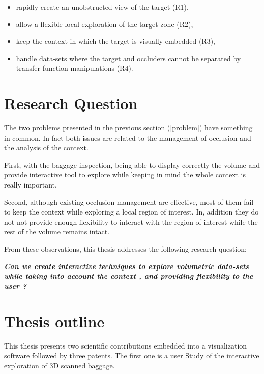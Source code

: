 \begin{itemize}

\item rapidly create an unobstructed view of the target (R1),

\item allow a flexible local exploration of the target zone (R2),

\item keep the context in which the target is visually embedded (R3),

\item handle data-sets where the target and occluders cannot 
be separated by transfer function manipulations (R4).

\end{itemize}

\section{Research Question}

The two problems presented in the previous section (\autoref{problem}) have something in common. In fact both issues are related to the management of occlusion and the analysis of the context. 

First, with the baggage inspection, being able to display correctly the volume and provide interactive tool to explore while keeping in mind the whole context is really important.

Second, although existing occlusion management are effective, most of them fail to keep the context while exploring a local region of interest. In, addition they do not not provide enough flexibility to interact with the region of interest while the rest of the volume remains intact.

From these observations, this thesis addresses the following research question: 

\textbf{\textit{
Can we create interactive techniques to explore volumetric data-sets  while taking into account the context , and providing flexibility to the user ? }}


\section{ Thesis outline }

This thesis presents two scientific contributions embedded into a visualization software followed by three patents. The first one is  a  user Study of the interactive exploration of 3D scanned baggage.

